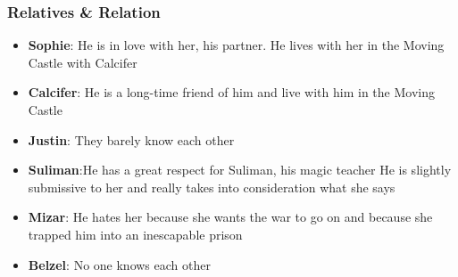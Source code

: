 




\subsubsection*{Relatives \& Relation}
\begin{itemize}
\item \textbf{Sophie}: He is in love with her, his partner. He lives with her in the Moving Castle
        with Calcifer
\item \textbf{Calcifer}: He is a long-time friend of him and live with him in the Moving Castle
\item \textbf{Justin}: They barely know each other
\item \textbf{Suliman}:He has a great respect for Suliman, his magic teacher
             He is slightly submissive to her and really takes into consideration what she says
\item \textbf{Mizar}: He hates her because she wants the war to go on and because she trapped him into an inescapable prison 
\item \textbf{Belzel}: No one knows each other
\end{itemize}

